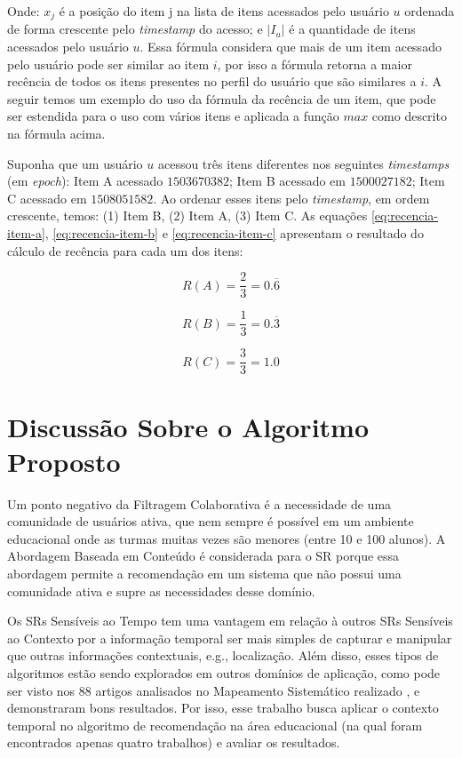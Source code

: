 Onde: $x_j$ é a posição do item j na lista de itens acessados pelo usuário $u$ ordenada de forma crescente pelo
\textit{timestamp} do acesso; e $\left| I_u \right|$ é a quantidade de itens acessados pelo usuário $u$. Essa fórmula considera
que mais de um item acessado pelo usuário pode ser similar ao item $i$, por isso a fórmula retorna a maior recência de
todos os itens presentes no perfil do usuário que são similares a $i$. A seguir temos um exemplo do uso da fórmula da
recência de um item, que pode ser estendida para o uso com vários itens e aplicada a função $max$ como descrito na
fórmula acima.

Suponha que um usuário $u$ acessou três itens diferentes nos seguintes \textit{timestamps} (em \textit{epoch}): Item A acessado $1503670382$;
Item B acessado em $1500027182$; Item C acessado em $1508051582$. Ao ordenar esses itens pelo \textit{timestamp}, em ordem
crescente, temos: (1) Item B, (2) Item A, (3) Item C. As equações \ref{eq:recencia-item-a}, \ref{eq:recencia-item-b} e
\ref{eq:recencia-item-c} apresentam o resultado do cálculo de recência para cada um dos itens:

\begin{equation}
  R(A) = \frac{2}{3} = 0.\overline{6}
  \label{eq:recencia-item-a}
\end{equation}

\begin{equation}
  R(B) = \frac{1}{3} = 0.\overline{3}
  \label{eq:recencia-item-b}
\end{equation}

\begin{equation}
  R(C) = \frac{3}{3} = 1.0
  \label{eq:recencia-item-c}
\end{equation}

\section{Discussão Sobre o Algoritmo Proposto}

Um ponto negativo da Filtragem Colaborativa é a necessidade de uma comunidade de usuários ativa, que nem sempre é
possível em um ambiente educacional onde as turmas muitas vezes são menores (entre 10 e 100 alunos). A Abordagem Baseada
em Conteúdo é considerada para o SR porque essa abordagem permite a recomendação em um sistema que não possui uma
comunidade ativa e supre as necessidades desse domínio.

Os SRs Sensíveis ao Tempo tem uma vantagem em relação à outros SRs Sensíveis ao Contexto por a informação temporal ser
mais simples de capturar e manipular que outras informações contextuais, e.g., localização. Além disso, esses tipos de
algoritmos estão sendo explorados em outros domínios de aplicação, como pode ser visto nos 88 artigos analisados no
Mapeamento Sistemático realizado \cite{de2017time}, e demonstraram bons resultados. Por isso, esse trabalho busca
aplicar o contexto temporal no algoritmo de recomendação na área educacional (na qual foram encontrados apenas quatro
trabalhos) e avaliar os resultados.

